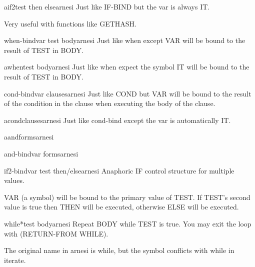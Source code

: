 \begin{macro}{aif2}{test then \op else}{arnesi}{}
  Just like IF-BIND but the var is always IT.

Very useful with functions like GETHASH.
\end{macro}

\begin{macro}{when-bind}{var test \body body}{arnesi}{}
  Just like when except VAR will be bound to the
  result of TEST in BODY.
\end{macro}

\begin{macro}{awhen}{test \body body}{arnesi}{}
  Just like when expect the symbol IT will be
  bound to the result of TEST in BODY.
\end{macro}

\begin{macro}{cond-bind}{var \body clauses}{arnesi}{}
  Just like COND but VAR will be bound to the result of the
  condition in the clause when executing the body of the clause.
\end{macro}

\begin{macro}{acond}{\rest clauses}{arnesi}{}
  Just like cond-bind except the var is automatically IT.
\end{macro}

\begin{macro}{aand}{\rest forms}{arnesi}{}
  
\end{macro}

\begin{macro}{and-bind}{var \rest forms}{arnesi}{}
  
\end{macro}

\begin{macro}{if2-bind}{var test \body then/else}{arnesi}{}
  Anaphoric IF control structure for multiple values.

VAR (a symbol) will be bound to the primary value of TEST.  If
TEST's second value is true then THEN will be executed, otherwise
ELSE will be executed.
\end{macro}

\begin{macro}{while*}{test \body body}{arnesi}{}
  Repeat BODY while TEST is true. You may exit the loop with
  (RETURN-FROM WHILE).
  \begin{devnote}
    The original name in arnesi is while, but the symbol conflicts
    with while in iterate.
  \end{devnote}
\end{macro}

